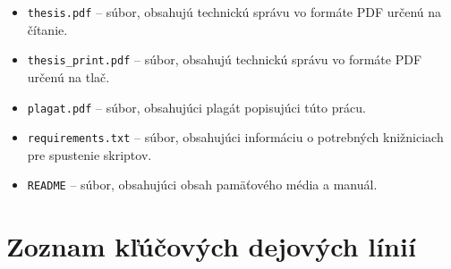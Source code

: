 \begin{itemize}
\begin{itemize}
    \end{itemize}
    \pagebreak
    \item {\tt thesis.pdf} -- súbor, obsahujú technickú správu vo formáte PDF určenú na čítanie.
    \item {\tt thesis\_print.pdf} -- súbor, obsahujú technickú správu vo formáte PDF určenú na tlač.
    \item {\tt plagat.pdf} -- súbor, obsahujúci plagát popisujúci túto prácu.
    \item {\tt requirements.txt} -- súbor, obsahujúci informáciu o potrebných knižniciach pre spustenie skriptov.
    \item {\tt README} -- súbor, obsahujúci obsah pamäťového média a manuál.
\end{itemize}

\chapter{Zoznam kľúčových dejových línií} \label{priloha-kdl}

